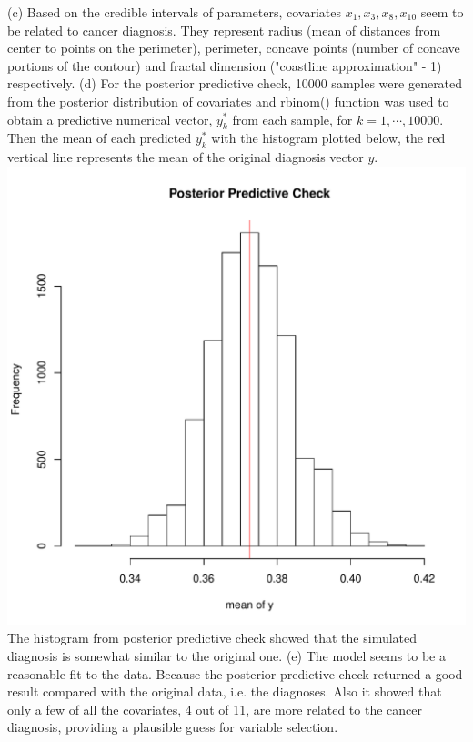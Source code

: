 \documentclass[12pt]{article}
\begin{document}
(c) Based on the credible intervals of parameters, covariates $x_1, x_3, x_8, x_{10}$ seem to be related to cancer diagnosis. They represent radius (mean of distances from center to points on the perimeter), perimeter, concave points (number of concave portions of the contour) and  fractal dimension ("coastline approximation" - 1) respectively. \newline
(d) For the posterior predictive check, 10000 samples were generated from the posterior distribution of covariates and rbinom() function was used to obtain a predictive numerical vector, $y^*_k$ from each sample, for $k = 1, \cdots, 10000$. Then the mean of each predicted $y^*_k$ with the histogram plotted below, the red vertical line represents the mean of the original diagnosis vector $y$. \newline
\includegraphics[width=\textwidth]{pb3_check.pdf} \newline
The histogram from posterior predictive check showed that the simulated diagnosis is somewhat similar to the original one.\newline
(e) The model seems to be a reasonable fit to the data. Because the posterior predictive check returned a good result compared with the original data, i.e. the diagnoses. Also it showed that only a few of all the covariates, 4 out of 11, are more related to the cancer diagnosis, providing a plausible guess for variable selection.
\end{document}
